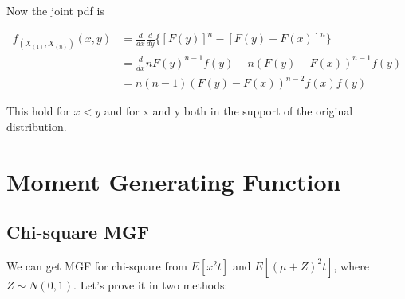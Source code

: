 \documentclass[11pt]{article} %
\begin{document}
Now the joint pdf is 

\begin{align*}
	f_{(X_{(1)}, X_{(n)})} (x,y) &= \frac{d}{dx} \frac{d}{dy} \{ [F(y)]^n - [F(y)- F(x)]^n\}\\
	&= \frac{d}{dx} n F(y)^{n-1} f(y) - n(F(y)- F(x))^{n-1} f(y) \\
	&= n (n-1) (F(y)- F(x))^{n-2} f(x) f(y)
\end{align*}

This hold for $x < y$ and for x and y both in the support of the original distribution.

\section{Moment Generating Function}

\subsection{Chi-square MGF}
We can get MGF for chi-square from $E[x^2 t]$ and $E[(\mu + Z)^2 t]$, where $Z \sim N(0,1)$.
Let's prove it in two methods:
\end{document}
